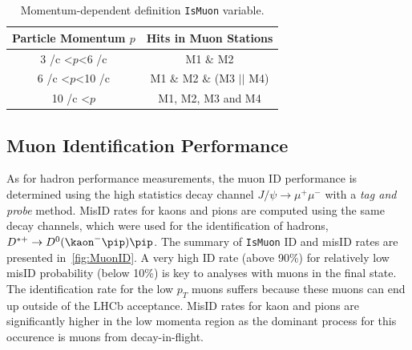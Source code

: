 \begin{table}[!h]
	\centering
	\hspace*{-0.8cm}
	\begin{tabular}{c c}
		\toprule
		Particle Momentum $p$  & Hits in Muon Stations \\ \hline
		3 \gev/c <$p$<6 \gev/c & M1 $\&$ M2\\
		6 \gev/c <$p$<10 \gev/c & M1 $\&$ M2 $\&$ (M3 $||$ M4) \\
		10 \gev/c <$p$ & M1, M2, M3 and M4 \\ \bottomrule      
	\end{tabular}
	\caption{Momentum-dependent definition \texttt{IsMuon} variable.}
	\label{tab:ismuontab}
\end{table}   

\subsection{Muon Identification Performance}
\label{muonperf}
As for hadron performance measurements, the muon ID performance is determined using the high statistics decay channel $J/\psi \rightarrow \mu^{+} \mu^{-}$ with a \textit{tag and probe} method. MisID rates for kaons and pions are computed using the same decay channels, which were used for the identification of hadrons, $D^{*+} \to D^{0}(\kaon^{-}\pip)\pip$. The summary of \texttt{IsMuon} ID and misID rates are presented in~\autoref{fig:MuonID}. A very high ID rate (above 90\%) for relatively low misID probability (below 10\%) is key to analyses with muons in the final state. The identification rate for the low $p_{T}$ muons suffers because these muons can end up outside of the \gls{LHCb} acceptance. MisID rates for kaon and pions are significantly higher in the low momenta region as the dominant process for this occurence is muons from decay-in-flight.   

